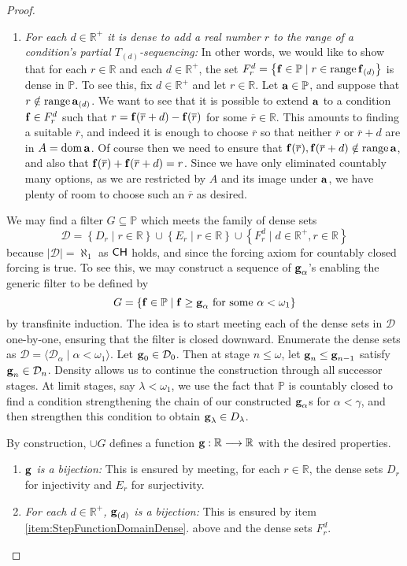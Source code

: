 \documentclass{amsart}
\theoremstyle{definition}
\theoremstyle{remark}
\renewcommand{\P}{\mathbb{P}}
\newcommand{\R}{\mathbb{R}}
\newcommand{\CH}{\textup{\textsf{CH}}}
\DeclareMathOperator{\ran}{range}
\DeclareMathOperator{\dom}{dom}
\newcommand{\st}{\; | \;}
\newcommand{\set}[2]{\left\{#1\st #2 \right\}}
\newcommand{\seq}[2]{\langle #1 \st #2 \rangle}
\newcommand{\To}{\longrightarrow}
\renewcommand{\a}{\textup{\textbf{a}}}
\newcommand{\g}{\textup{\textbf{g}}}
\newcommand{\f}{\textup{\textbf{f}}}
\renewcommand{\r}{\overline r}
\begin{document}
\begin{proof}
\begin{enumerate}
	\item \emph{For each $d \in \R^+$ it is dense to add a real number $r$ to the range of a condition's partial $T_{(d)}$-sequencing:} In other words, we would like to show that for each $r \in \R$ and each $d \in \R^+$, the set $F^d_r=\set{\f \in \P}{r \in \ran \f_{(d)}}$ is dense in $\P$. To see this, fix $d \in \R^+$ and let $r \in \R$. Let $\a \in \P$, and suppose that $r \notin \ran\a_{(d)}$. We want to see that it is possible to extend $\a$ to a condition $\f \in F^d_r$ such that $r=\f(\r+d)-\f(\r)$ for some $\r \in \R$. This amounts to finding a suitable $\r$, and indeed it is enough to choose $\r$ so that neither $\r$ or $\r+d$ are in $A = \dom \a$. Of course then we need to ensure that $\f(\r), \f(\r+d) \notin \ran \a$, and also that $\f(\r)+\f(\r+d)=r$. Since we have only eliminated countably many options, as we are restricted by $A$ and its image under $\a$, we have plenty of room to choose such an $\r$ as desired.
\end{enumerate}

We may find a filter $G \subseteq \P$ which meets the family of dense sets $$\mathcal D = \set{D_r}{r\in \R} \cup \set{E_r}{r \in \R} \cup \set{F^d_r}{d \in \R^+, r \in \R}$$ because $|\mathcal D|=\aleph_1$ as $\CH$ holds, and since the forcing axiom for countably closed forcing is true. To see this, we may construct a sequence of $\g_\alpha$'s enabling the generic filter to be defined by $$G=\set{\f \in \P}{\f \geq \g_\alpha \text{ for some } \alpha<\omega_1}$$ by transfinite induction. The idea is to start meeting each of the dense sets in $\mathcal D$ one-by-one, ensuring that the filter is closed downward. Enumerate the dense sets as $\mathcal D = \seq{\mathcal D_\alpha}{\alpha<\omega_1}$. Let $\g_0 \in \mathcal D_0$. Then at stage $n \leq \omega$, let $\g_n \leq \g_{n-1}$ satisfy $\g_n \in \mathcal D_n$. Density allows us to continue the construction through all successor stages. At limit stages, say $\lambda <\omega_1$, we use the fact that $\P$ is countably closed to find a condition strengthening the chain of our constructed $\g_\alpha$s for $\alpha<\gamma$, and then strengthen this condition to obtain $\g_\lambda \in D_\lambda$.

By construction, $\cup G$ defines a function $\g: \R \To \R$ with the desired properties. \begin{enumerate}
	\item \emph{$\g$ is a bijection:} This is ensured by meeting, for each $r \in \R$, the dense sets $D_r$ for injectivity and $E_r$ for surjectivity.
	\item \emph{For each $d \in \R^+$, $\g_{(d)}$ is a bijection:} This is ensured by item \ref{item:StepFunctionDomainDense}. above and the dense sets $F^d_r$.
\end{enumerate}
\end{proof}
		
\end{document}
